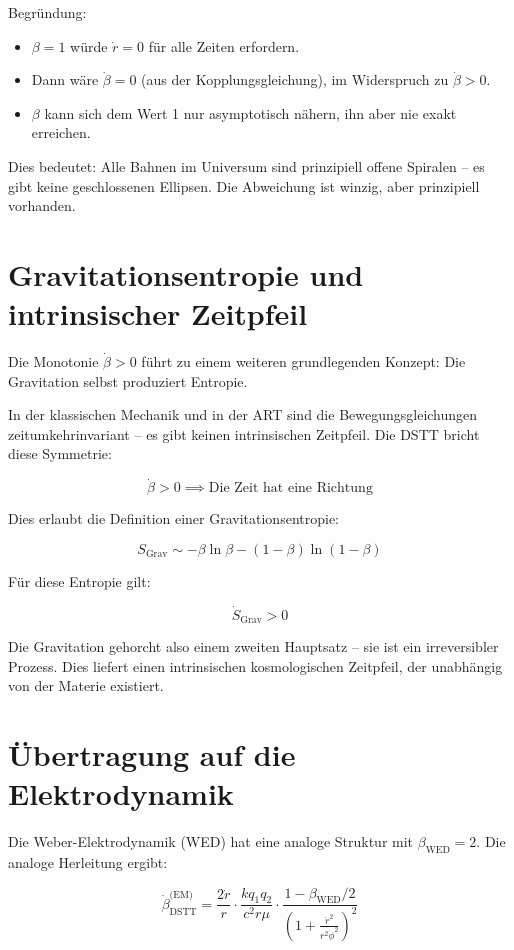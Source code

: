 Begründung:
\begin{itemize}
    \item \(\beta = 1\) würde \(\dot{r} = 0\) für alle Zeiten erfordern.
    \item Dann wäre \(\dot{\beta} = 0\) (aus der Kopplungsgleichung), im Widerspruch zu \(\dot{\beta} > 0\).
    \item \(\beta\) kann sich dem Wert 1 nur asymptotisch nähern, ihn aber nie exakt erreichen.
\end{itemize}

Dies bedeutet: Alle Bahnen im Universum sind prinzipiell offene Spiralen – es gibt keine geschlossenen Ellipsen. Die Abweichung ist winzig, aber prinzipiell vorhanden.

\section{Gravitationsentropie und intrinsischer Zeitpfeil}
\label{sec:gravitationsentropie}

Die Monotonie \(\dot{\beta} > 0\) führt zu einem weiteren grundlegenden Konzept: Die Gravitation selbst produziert Entropie.

In der klassischen Mechanik und in der ART sind die Bewegungsgleichungen zeitumkehrinvariant – es gibt keinen intrinsischen Zeitpfeil. Die DSTT bricht diese Symmetrie:

\[
\dot{\beta} > 0 \implies \text{Die Zeit hat eine Richtung}
\]

Dies erlaubt die Definition einer Gravitationsentropie:

\[
S_{\text{Grav}} \sim -\beta \ln \beta - (1-\beta)\ln(1-\beta)
\]

Für diese Entropie gilt:

\[
\dot{S}_{\text{Grav}} > 0
\]

Die Gravitation gehorcht also einem zweiten Hauptsatz – sie ist ein irreversibler Prozess. Dies liefert einen intrinsischen kosmologischen Zeitpfeil, der unabhängig von der Materie existiert.

\section{Übertragung auf die Elektrodynamik}
\label{sec:dstt_elektrodynamik}

Die Weber-Elektrodynamik (WED) hat eine analoge Struktur mit \(\beta_{\text{WED}} = 2\). Die analoge Herleitung ergibt:

\[
\dot{\beta}_{\text{DSTT}}^{\text{(EM)}} = \frac{2\dot{r}}{r} \cdot \frac{k q_1 q_2}{c^2 r \mu} \cdot \frac{1 - \beta_{\text{WED}}/2}{\left(1 + \frac{\dot{r}^2}{r^2\dot{\phi}^2}\right)^2}
\]

